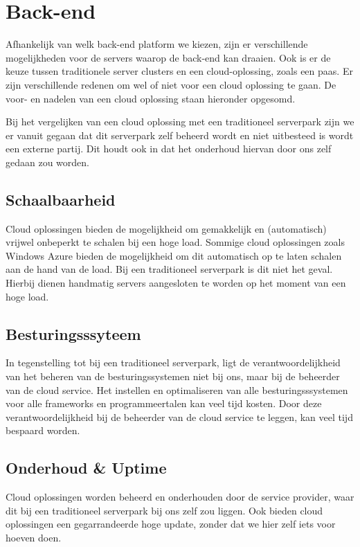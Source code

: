\section{Back-end}\label{sec:orientatie-back-end}
Afhankelijk van welk back-end platform we kiezen, zijn er verschillende mogelijkheden voor de servers waarop de back-end kan draaien. Ook is er de keuze tussen traditionele server clusters en een cloud-oplossing, zoals een \ac{paas}. Er zijn verschillende redenen om wel of niet voor een cloud oplossing te gaan. De voor- en nadelen van een cloud oplossing staan hieronder opgesomd.

Bij het vergelijken van een cloud oplossing met een traditioneel serverpark zijn we er vanuit gegaan dat dit serverpark zelf beheerd wordt en niet uitbesteed is wordt een externe partij. Dit houdt ook in dat het onderhoud hiervan door ons zelf gedaan zou worden.

\subsection{Schaalbaarheid}
Cloud oplossingen bieden de mogelijkheid om gemakkelijk en (automatisch) vrijwel onbeperkt te schalen bij een hoge load. Sommige cloud oplossingen zoals Windows Azure bieden de mogelijkheid om dit automatisch op te laten schalen aan de hand van de load. Bij een traditioneel serverpark is dit niet het geval. Hierbij dienen handmatig servers aangesloten te worden op het moment van een hoge load. 


\subsection{Besturingsssyteem}
In tegenstelling tot bij een traditioneel serverpark, ligt de verantwoordelijkheid van het beheren van de besturingssystemen niet bij ons, maar bij de beheerder van de cloud service. Het instellen en optimaliseren van alle besturingsssystemen voor alle frameworks en programmeertalen kan veel tijd kosten. Door deze verantwoordelijkheid bij de beheerder van de cloud service te  leggen, kan veel tijd bespaard worden.

\subsection{Onderhoud \& Uptime}
Cloud oplossingen worden beheerd en onderhouden door de service provider, waar dit bij een traditioneel serverpark bij ons zelf zou liggen. Ook bieden cloud oplossingen een gegarrandeerde hoge update, zonder dat we hier zelf iets voor hoeven doen.

